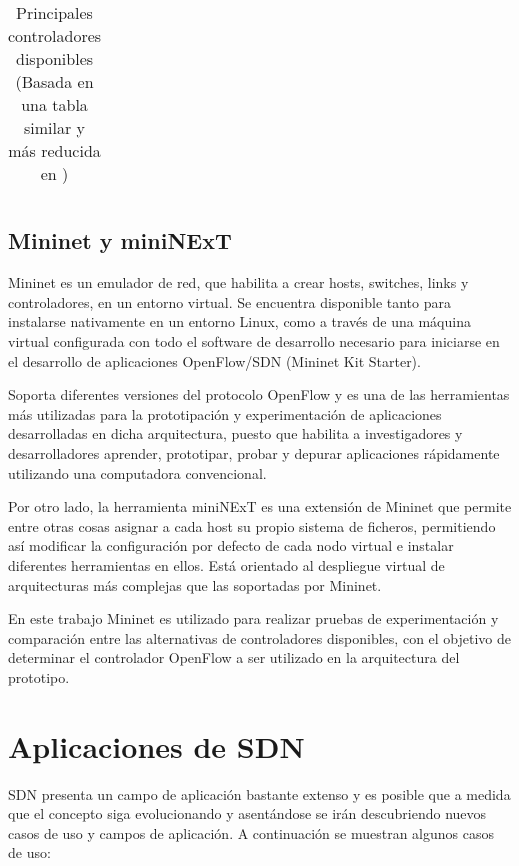 \begin{table}[htbp!]
\begin{tabular}{|l|l|l|p{2cm}|l|p{5cm}|}
\hline   
\end{tabular}
\caption[Principales controladores disponibles]{Principales controladores disponibles (Basada en una tabla similar y más reducida en \cite{StateOfArt1})}
\label{table:Controladores}
\end{table}

\newpage
\subsection{Mininet y miniNExT}
Mininet \cite{Mininet1} es un emulador de red, que habilita a crear hosts, switches, links y controladores, en un entorno virtual. Se encuentra disponible tanto para instalarse nativamente en un entorno Linux, como a través de una m\'aquina virtual configurada con todo el software de desarrollo necesario para iniciarse en el desarrollo de aplicaciones OpenFlow/SDN (Mininet Kit Starter). 

Soporta diferentes versiones del protocolo OpenFlow y es una de las herramientas m\'as utilizadas para la prototipaci\'on y experimentación de aplicaciones desarrolladas en dicha arquitectura, puesto que habilita a investigadores y desarrolladores aprender, prototipar, probar y depurar aplicaciones rápidamente utilizando una computadora convencional.

Por otro lado, la herramienta miniNExT \cite{MiniNext} es una extensi\'on de Mininet que permite entre otras cosas asignar a cada host su propio sistema de ficheros, permitiendo as\'i modificar la configuraci\'on por defecto de cada nodo virtual e instalar diferentes herramientas en ellos. Est\'a orientado al despliegue virtual de arquitecturas m\'as complejas que las soportadas por Mininet.  

En este trabajo Mininet es utilizado para realizar pruebas de experimentaci\'on y comparación entre las alternativas de controladores disponibles, con el objetivo de determinar el controlador OpenFlow a ser utilizado en la arquitectura del prototipo.

\section{Aplicaciones de SDN}
\label{section2.5}

SDN presenta un campo de aplicación bastante extenso y es posible que a medida que el concepto siga evolucionando y asentándose se irán descubriendo nuevos casos de uso y campos de aplicación. A continuación se muestran algunos casos de uso:

